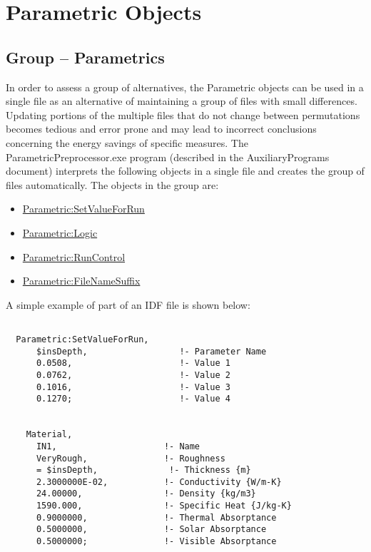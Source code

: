 \chapter{Parametric Objects}\label{parametric-objects}

\section{Group -- Parametrics}\label{group-parametrics}

In order to assess a group of alternatives, the Parametric objects can be used in a single file as an alternative of maintaining a group of files with small differences. Updating portions of the multiple files that do not change between permutations becomes tedious and error prone and may lead to incorrect conclusions concerning the energy savings of specific measures. The ParametricPreprocessor.exe program (described in the AuxiliaryPrograms document) interprets the following objects in a single file and creates the group of files automatically. The objects in the group are:

\begin{itemize}
\item
  \hyperref[parametricsetvalueforrun]{Parametric:SetValueForRun}
\item
  \hyperref[parametriclogic]{Parametric:Logic}
\item
  \hyperref[parametricruncontrol]{Parametric:RunControl}
\item
  \hyperref[parametricfilenamesuffix]{Parametric:FileNameSuffix}
\end{itemize}

A simple example of part of an IDF file is shown below:

\begin{lstlisting}

  Parametric:SetValueForRun,
      $insDepth,                  !- Parameter Name
      0.0508,                     !- Value 1
      0.0762,                     !- Value 2
      0.1016,                     !- Value 3
      0.1270;                     !- Value 4


    Material,
      IN1,                     !- Name
      VeryRough,               !- Roughness
      = $insDepth,              !- Thickness {m}
      2.3000000E-02,           !- Conductivity {W/m-K}
      24.00000,                !- Density {kg/m3}
      1590.000,                !- Specific Heat {J/kg-K}
      0.9000000,               !- Thermal Absorptance
      0.5000000,               !- Solar Absorptance
      0.5000000;               !- Visible Absorptance
\end{lstlisting}

